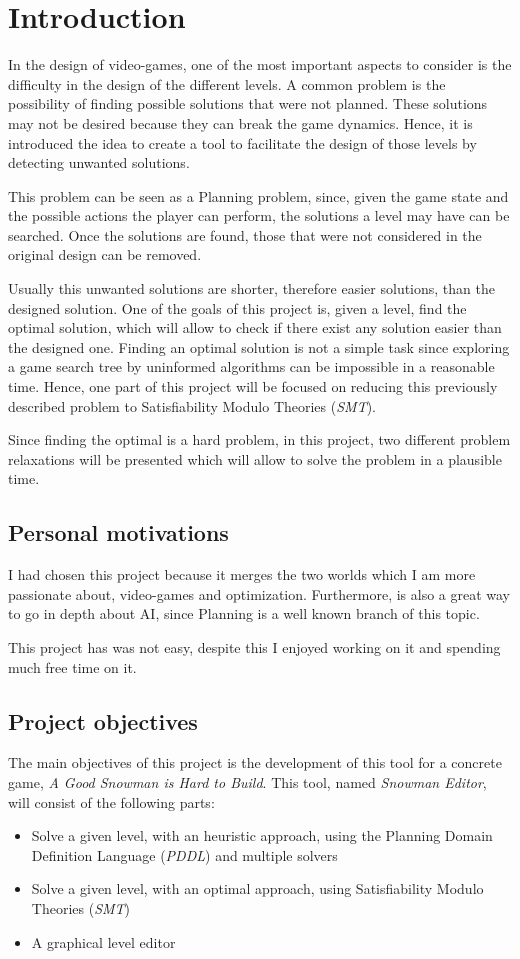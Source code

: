 \documentclass{report}
\theoremstyle{plain}
\begin{document}
\chapter{Introduction}
In the design of video-games, one of the most important aspects to consider is the difficulty in the design of the different levels. A common problem is the possibility of finding possible solutions that were not planned. These solutions may not be desired because they can break the game dynamics. Hence, it is introduced the idea to create a tool to facilitate the design of those levels by detecting unwanted solutions.

This problem can be seen as a Planning problem, since, given the game state and the possible actions the player can perform, the solutions a level may have can be searched. Once the solutions are found, those that were not considered in the original design can be removed.

Usually this unwanted solutions are shorter, therefore easier solutions, than the designed solution. One of the goals of this project is, given a level, find the optimal solution, which will allow to check if there exist any solution easier than the designed one. Finding an optimal solution is not a simple task since exploring a game search tree by uninformed algorithms can be impossible in a reasonable time. Hence, one part of this project will be focused on reducing this previously described problem to Satisfiability Modulo Theories (\emph{SMT}).

Since finding the optimal is a hard problem, in this project, two different problem relaxations will be presented which will allow to solve the problem in a plausible time.

\section{Personal motivations}
I had chosen this project because it merges the two worlds which I am more passionate about, video-games and optimization. Furthermore, is also a great way to go in depth about AI, since Planning is a well known branch of this topic.

This project has was not easy, despite this I enjoyed working on it and spending much free time on it. 

\section{Project objectives}
The main objectives of this project is the development of this tool for a concrete game, \emph{A Good Snowman is Hard to Build}. This tool, named \emph{Snowman Editor}, will consist of the following parts:
\begin{itemize}
    \item Solve a given level, with an heuristic approach, using the Planning Domain Definition Language (\emph{PDDL}) and multiple solvers
    \item Solve a given level, with an optimal approach, using Satisfiability Modulo Theories (\emph{SMT}) 
    \item A graphical level editor
\end{itemize}
\end{document}
